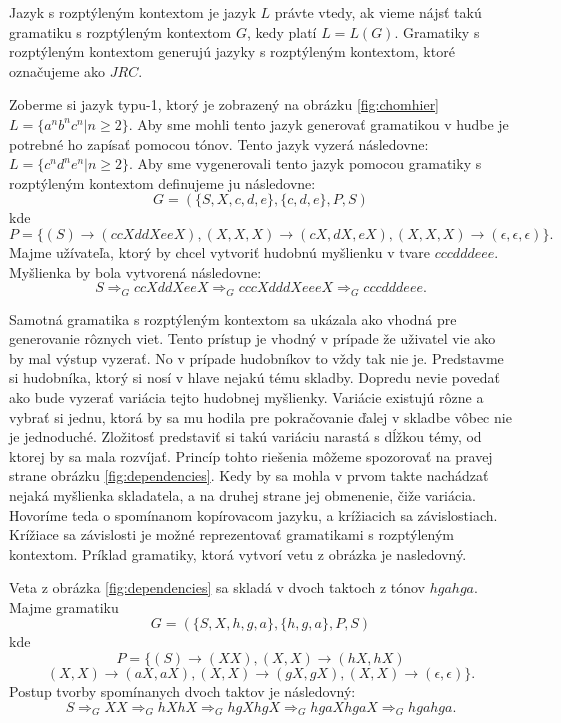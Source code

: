 Jazyk s rozptýleným kontextom je jazyk $L$ právte vtedy, ak vieme nájsť takú gramatiku s rozptýleným kontextom $G$, kedy platí $L = L(G)$. Gramatiky s rozptýleným kontextom generujú jazyky s rozptýleným kontextom, ktoré označujeme ako $JRC$.

\begin{example}
    Zoberme si jazyk typu-1, ktorý je zobrazený na obrázku \ref{fig:chomhier} \\ $L = \{a^n b^n c^n| n \geq 2\}$. Aby sme mohli tento jazyk generovať gramatikou v hudbe je potrebné ho zapísať pomocou tónov. Tento jazyk vyzerá následovne: $L = \{c^n d^n e^n| n \geq 2\}$. Aby sme vygenerovali tento jazyk pomocou gramatiky s rozptýleným kontextom definujeme ju následovne: $$ G = (\{S, X, c, d, e\}, \{c,d,e\}, P, S)$$ kde $$P = \{(S) \rightarrow (ccXddXeeX), (X,X,X) \rightarrow (cX, dX, eX), (X,X,X) \rightarrow (\epsilon, \epsilon, \epsilon)\}.$$
    Majme užívateľa, ktorý by chcel vytvoriť hudobnú myšlienku v tvare $cccdddeee$. Myšlienka by bola vytvorená následovne: $$ S \Rightarrow_G  ccXddXeeX \Rightarrow_G cccXdddXeeeX \Rightarrow_G cccdddeee.$$
\end{example}

Samotná gramatika s rozptýleným kontextom sa ukázala ako vhodná pre generovanie rôznych viet. Tento prístup je vhodný v prípade že uživatel vie ako by mal výstup vyzerať. No v prípade hudobníkov to vždy tak nie je. Predstavme si hudobníka, ktorý si nosí v hlave nejakú tému skladby. Dopredu nevie povedať ako bude vyzerať variácia tejto hudobnej myšlienky. Variácie existujú rôzne a vybrať si jednu, ktorá by sa mu hodila pre pokračovanie ďalej v skladbe vôbec nie je jednoduché. Zložitosť predstaviť si takú variáciu narastá s dĺžkou témy, od ktorej by sa mala rozvíjať. Princíp tohto riešenia môžeme spozorovať na pravej strane obrázku \ref{fig:dependencies}. Kedy by sa mohla v prvom takte nachádzať nejaká myšlienka skladatela, a na druhej strane jej obmenenie, čiže variácia. Hovoríme teda o spomínanom kopírovacom jazyku, a krížiacich sa závislostiach. Krížiace sa závislosti je možné reprezentovať gramatikami s rozptýleným kontextom. Príklad gramatiky, ktorá vytvorí vetu z obrázka je nasledovný.

\begin{example}
Veta z obrázka \ref{fig:dependencies} sa skladá v dvoch taktoch z tónov $hgahga$. Majme gramatiku $$G = (\{S,X,h,g,a\}, \{h,g,a\}, P, S)$$ kde $$P = \{(S) \rightarrow (XX), (X,X) \rightarrow (hX,hX)$$ $$(X,X) \rightarrow (aX,aX), (X,X) \rightarrow (gX,gX), (X,X) \rightarrow (\epsilon, \epsilon)\}.$$ Postup tvorby spomínanych dvoch taktov je následovný: $$S \Rightarrow_G XX \Rightarrow_G hXhX \Rightarrow_G hgXhgX \Rightarrow_G hgaXhgaX \Rightarrow_G hgahga.$$
\end{example}

